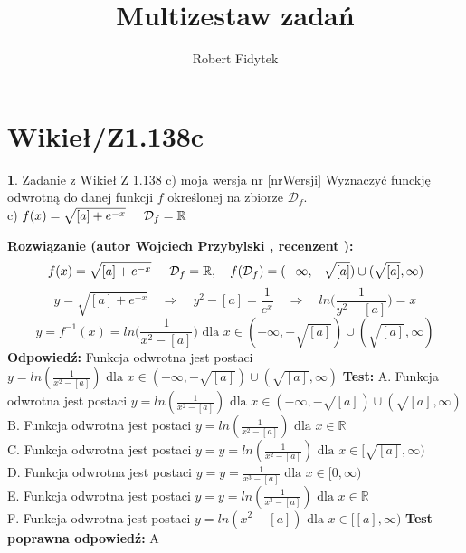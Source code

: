 \documentclass[12pt, a4paper]{article}
\title{Multizestaw zadań}
\author{Robert Fidytek}
\date{}
\theoremstyle{definition} %
\newtheorem{zad}{}
\newcommand{\kategoria}[1]{\section{#1}} %
\newcommand{\zadStart}[1]{\begin{zad}#1\newline} %
\newcommand{\zadStop}{\end{zad}}   %
\newcommand{\rozwStart}[2]{\noindent \textbf{Rozwiązanie (autor #1 , recenzent #2): }\newline} %
\newcommand{\rozwStop}{\newline}                                            %
\newcommand{\odpStart}{\noindent \textbf{Odpowiedź:}\newline}    %
\newcommand{\odpStop}{\newline}                                             %
\newcommand{\testStart}{\noindent \textbf{Test:}\newline} %
\newcommand{\testStop}{\newline} %
\newcommand{\kluczStart}{\noindent \textbf{Test poprawna odpowiedź:}\newline} %
\newcommand{\kluczStop}{\newline} %
\begin{document}
\maketitle


\kategoria{Wikieł/Z1.138c}
\zadStart{Zadanie z Wikieł Z 1.138 c) moja wersja nr [nrWersji]}
Wyznaczyć funckję odwrotną do danej funkcji $f$ określonej na zbiorze $\mathcal{D}_{f}$.\\
c) $f(x)=\sqrt{[a]+e^{-x}}\hspace{5mm}\mathcal{D}_{f}=\mathbb{R}$
\zadStop
\rozwStart{Wojciech Przybylski}{}
$$f(x)=\sqrt{[a]+e^{-x}}\hspace{5mm} \mathcal{D}_{f}=\mathbb{R}, \quad f(\mathcal{D}_{f})=(-\infty,-\sqrt{[a]})\cup (\sqrt{[a]},\infty)$$
$$y=\sqrt{[a]+e^{-x}} \quad \Rightarrow \quad y^{2}-[a]=\frac{1}{e^{x}} \quad \Rightarrow \quad ln\Big(\frac{1}{y^{2}-[a]}\Big)=x$$
$$y=f^{-1}(x)=ln\Big(\frac{1}{x^{2}-[a]}\Big) \mbox{ dla } x\in (-\infty,-\sqrt{[a]})\cup (\sqrt{[a]},\infty) $$
\rozwStop
\odpStart
Funkcja odwrotna jest postaci $y=ln(\frac{1}{x^{2}-[a]}) \mbox{ dla }x\in (-\infty,-\sqrt{[a]})\cup (\sqrt{[a]},\infty)$
\odpStop
\testStart
A. Funkcja odwrotna jest postaci $y=ln(\frac{1}{x^{2}-[a]}) \mbox{ dla }x\in(-\infty,-\sqrt{[a]})\cup (\sqrt{[a]},\infty)$\\
B. Funkcja odwrotna jest postaci $y=ln(\frac{1}{x^{2}-[a]}) \mbox{ dla }x\in\mathbb{R}$\\
C. Funkcja odwrotna jest postaci $y=y=ln(\frac{1}{x^{2}-[a]}) \mbox{ dla }x\in[\sqrt{[a]},\infty)$\\
D. Funkcja odwrotna jest postaci $y=y=\frac{1}{x^{3}-[a]} \mbox{ dla }x\in[0,\infty)$\\
E. Funkcja odwrotna jest postaci $y=y=ln(\frac{1}{x^{3}-[a]}) \mbox{ dla }x\in \mathbb{R}$\\
F. Funkcja odwrotna jest postaci $y=ln(x^{2}-[a])\mbox{ dla }x\in[[a],\infty)$
\testStop
\kluczStart
A
\kluczStop
\end{document}

